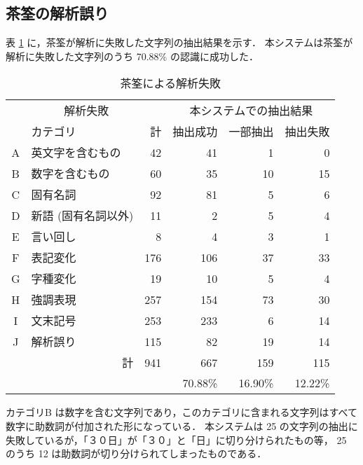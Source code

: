 \subsection{茶筌の解析誤り}
\label{sec:chasenfail}
表 \ref{tab:fail-category} に，茶筌が解析に失敗した文字列の抽出結果を示す．
本システムは茶筌が解析に失敗した文字列のうち 70.88\% の認識に成功した．
\begin{table}[hbt]
\begin{minipage}{\textwidth}
\begin{center}
\caption{茶筌による解析失敗}
\label{tab:fail-category}
\begin{tabular}{clrrrr}
\hline
\hline
\multicolumn{3}{c}{解析失敗}& \multicolumn{3}{c}{本システムでの抽出結果} \\
 & カテゴリ & 計  & 抽出成功 & 一部抽出 & 抽出失敗    \\
\hline
A& 英文字を含むもの    &  42 &    41   &     1   &     0   \\
B& 数字を含むもの      &  60 &    35   &    10   &    15   \\
C& 固有名詞            &  92 &    81   &     5   &     6   \\
D& 新語 (固有名詞以外) &  11 &     2   &     5   &     4   \\
E& 言い回し            &   8 &     4   &     3   &     1   \\
F& 表記変化            & 176 &   106   &    37   &    33   \\
G& 字種変化            &  19 &    10   &     5   &     4   \\
H& 強調表現            & 257 &   154   &    73   &    30   \\
I& 文末記号            & 253 &   233   &     6   &    14   \\
J& 解析誤り            & 115 &    82   &    19   &    14   \\
\hline
\multicolumn{2}{r}{計} & 941 &   667   &   159   &   115   \\
&                      &     & 70.88\% & 16.90\% & 12.22\% \\
\hline
\hline
\end{tabular}
\end{center}
\end{minipage}
\end{table}
カテゴリB は数字を含む文字列であり，このカテゴリに含まれる文字列はすべて数字に助数詞が付加された形になっている．
本システムは 25 の文字列の抽出に失敗しているが，「３０日」が「３０」と「日」に切り分けられたもの等， 25 のうち 12 は助数詞が切り分けられてしまったものである．

